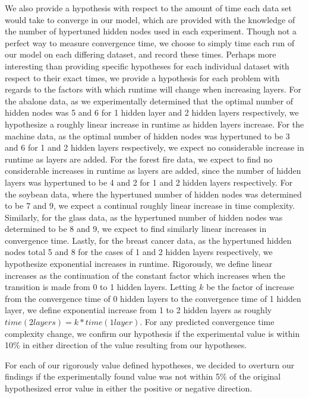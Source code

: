 \documentclass[twoside,11pt]{article}
\begin{document}
  We also provide a hypothesis with respect to the amount of time each data set would take to converge in our model, which are provided with the knowledge of
  the number of hypertuned hidden nodes used in each experiment. 
  Though not a perfect way to measure
  convergence time, we choose to simply time each run of our model on each differing dataset, and record these times. Perhaps more interesting than providing
  specific hypotheses for each individual dataset with respect to their exact times, we provide a hypothesis for each problem with regards to the factors with
  which runtime will change when increasing layers. For the abalone data, as we experimentally determined that the optimal number of hidden nodes was 5 and 6 for
  1 hidden layer and 2 hidden layers respectively, we hypothesize a roughly linear increase in runtime as hidden layers increase. For the machine data, as the optimal
  number of hidden nodes was hypertuned to be 3 and 6 for 1 and 2 hidden layers respectively, we expect no considerable increase in runtime as layers are added. For
  the forest fire data, we expect to find no considerable increases in runtime as layers are added, since the number of hidden layers was hypertuned to be
  4 and 2 for 1 and 2 hidden layers respectively. For the soybean data, where the hypertuned number of hidden nodes was determined to be 7 and 9, we expect a
  continual roughly linear increase in time complexity. Similarly, for the glass data, as the hypertuned number of hidden nodes was determined to be 8 and 9,
  we expect to find similarly linear increases in convergence time. Lastly, for the breast cancer data, as the hypertuned hidden nodes total 5 and 8 for the cases
  of 1 and 2 hidden layers respectively, we hypothesize exponential increases in runtime. Rigorously, we define linear increases as the continuation of the constant
  factor which increases when the transition is made from 0 to 1 hidden layers. Letting $k$ be the factor of increase from the convergence time of 0 hidden layers 
  to the convergence time of 1
  hidden layer, we define exponential increase from 1 to 2 hidden layers as roughly $time(2layers) = k*time(1layer)$. For any predicted convergence time complexity
  change, we confirm our hypothesis if the experimental value is within 10\% in either direction of the value resulting from our hypotheses.

  For each of our rigorously value defined hypotheses, we decided to overturn our findings if the experimentally found value was not within 5\% of the original 
  hypothesized error value in either the positive or negative direction.
\end{document}
